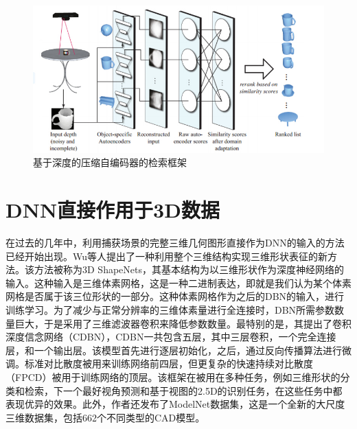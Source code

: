 \documentclass[twoside,UTF8]{nputhesis}
\begin{document}
\begin{figure}[tb]
\begin{center}
\includegraphics[width=0.9\linewidth]{figures/Feng.jpg} 
\end{center} 
\vspace{-4mm}
\caption{基于深度的压缩自编码器的检索框架} 
\label{fig_Feng}
\end{figure}

\section{DNN直接作用于3D数据}
在过去的几年中，利用捕获场景的完整三维几何图形直接作为DNN的输入的方法已经开始出现。Wu等人\cite{Wu20143D}提出了一种利用整个三维结构实现三维形状表征的新方法。该方法被称为3D ShapeNets，其基本结构为以三维形状作为深度神经网络的输入。这种输入是三维体素网格，这是一种二进制表达，即就是我们认为某个体素网格是否属于该三位形状的一部分。这种体素网格作为之后的DBN的输入，进行训练学习。为了减少与正常分辨率的三维体素量进行全连接时，DBN所需参数数量巨大，于是采用了三维滤波器卷积来降低参数数量。最特别的是，其提出了卷积深度信念网络（CDBN），CDBN一共包含五层，其中三层卷积，一个完全连接层，和一个输出层。该模型首先进行逐层初始化，之后，通过反向传播算法进行微调。标准对比散度被用来训练网络前四层，但更复杂的快速持续对比散度（FPCD）被用于训练网络的顶层。该框架在被用在多种任务，例如三维形状的分类和检索，下一个最好视角预测和基于视图的2.5D的识别任务，在这些任务中都表现优异的效果。此外，作者还发布了ModelNet数据集，这是一个全新的大尺度三维数据集，包括662个不同类型的CAD模型。
\end{document}
